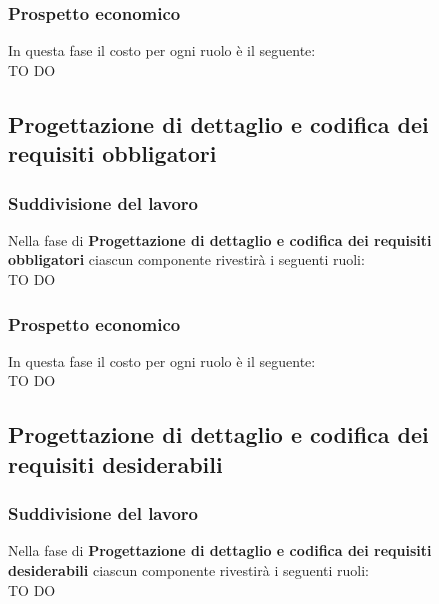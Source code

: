 		\subsubsection{Prospetto economico} %
		\label{ssub:prospetto_economico}
		In questa fase il costo per ogni ruolo è il seguente: \\
		TO DO
		
	
	\subsection{Progettazione di dettaglio e codifica dei requisiti obbligatori} %
	\label{sub:progettazione_di_dettaglio_e_codifica_dei_requisiti_obbligatori}
		\subsubsection{Suddivisione del lavoro} %
		\label{ssub:suddivisione_del_lavoro}
		Nella fase di \textbf{Progettazione di dettaglio e codifica dei requisiti obbligatori} ciascun componente rivestirà i seguenti ruoli: \\
		TO DO
		
		\subsubsection{Prospetto economico} %
		\label{ssub:prospetto_economico}
		In questa fase il costo per ogni ruolo è il seguente: \\
		TO DO
		
	
	\subsection{Progettazione di dettaglio e codifica dei requisiti desiderabili} %
	\label{sub:progettazione_di_dettaglio_e_codifica_dei_requisiti_desiderabili}
		\subsubsection{Suddivisione del lavoro} %
		\label{ssub:suddivisione_del_lavoro}
		Nella fase di \textbf{Progettazione di dettaglio e codifica dei requisiti desiderabili} ciascun componente rivestirà i seguenti ruoli: \\
		TO DO
		
